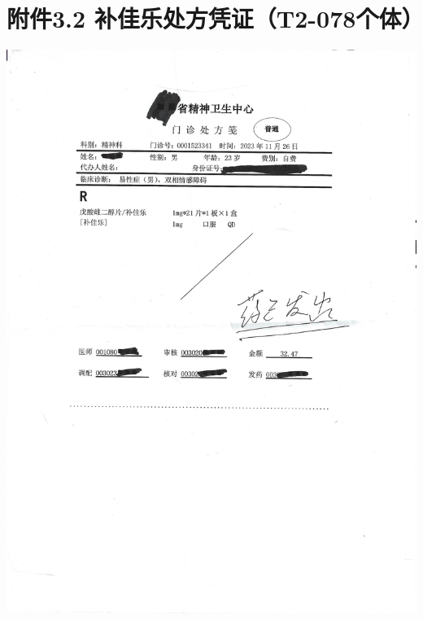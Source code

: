 \documentclass[]{ctexrep}
\begin{document}
	\section*{附件3.2 补佳乐处方凭证（T2-078个体）}
	\label{附件3.2}
	\includegraphics[scale=0.6]{./附件3.2.png}
	
\end{document}

